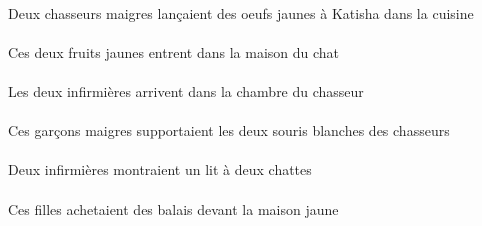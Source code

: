 \begin{exe}
\DEFSgOblP{}   \cuisineCSgOblP{}   \DANSP{}   \INDDuErgP{}   \maigreCDuP{}   \chasseurCDuErgP{}    \INDSgDatP{}   \KatishaASgDatP{}   \INDPlAbsP{}   \jauneDPlP{}   \oeufDPlAbsP{}  \lancerVdPstDPlP{}\\
Deux chasseurs maigres lançaient des oeufs jaunes à Katisha dans la cuisine
\ex\gll
\DEMDuAbs{}   \jauneBDu{}   \fruitBDuAbs{}    \DEFSgObl{}    \DEFSgObl{}   \chatDSgObl{}   \DE{}   \maisonDSgObl{}   \DANS{}  \entrerViPrsBDu{}\\
\DEMDuAbsP{}   \jauneBDuP{}   \fruitBDuAbsP{}    \DEFSgOblP{}    \DEFSgOblP{}   \chatDSgOblP{}   \DEP{}   \maisonDSgOblP{}   \DANSP{}  \entrerViPrsBDuP{}\\
Ces deux fruits jaunes entrent dans la maison du chat
\ex\gll
\DEFDuAbs{}   \infirmiereBDuAbs{}    \DEFSgObl{}    \DEFSgObl{}   \chasseurCSgObl{}   \DE{}   \chambreBSgObl{}   \DANS{}  \arriverViPrsBDu{}\\
\DEFDuAbsP{}   \infirmiereBDuAbsP{}    \DEFSgOblP{}    \DEFSgOblP{}   \chasseurCSgOblP{}   \DEP{}   \chambreBSgOblP{}   \DANSP{}  \arriverViPrsBDuP{}\\
Les deux infirmières arrivent dans la chambre du chasseur
\ex\gll
\DEMPlErg{}   \maigreBPl{}   \garconBPlErg{}   \DEFDuAbs{}    \DEFPlObl{}   \chasseurCPlObl{}   \DE{}   \blancADu{}   \sourisADuAbs{}  \supporterVtPstADu{}\\
\DEMPlErgP{}   \maigreBPlP{}   \garconBPlErgP{}   \DEFDuAbsP{}    \DEFPlOblP{}   \chasseurCPlOblP{}   \DEP{}   \blancADuP{}   \sourisADuAbsP{}  \supporterVtPstADuP{}\\
Ces garçons maigres supportaient les deux souris blanches des chasseurs
\ex\gll
\INDDuErg{}   \infirmiereBDuErg{}    \INDDuDat{}   \chatDDuDat{}   \INDSgAbs{}   \litDSgAbs{}  \montrerVdPstDSg{}\\
\INDDuErgP{}   \infirmiereBDuErgP{}    \INDDuDatP{}   \chatDDuDatP{}   \INDSgAbsP{}   \litDSgAbsP{}  \montrerVdPstDSgP{}\\
Deux infirmières montraient un lit à deux chattes
\ex\gll
\DEFSgObl{}   \jauneDSg{}   \maisonDSgObl{}   \DEVANT{}   \DEMPlErg{}   \filleCPlErg{}   \INDPlAbs{}   \balaiCPlAbs{}  \acheterVtPstCPl{}\\
\DEFSgOblP{}   \jauneDSgP{}   \maisonDSgOblP{}   \DEVANTP{}   \DEMPlErgP{}   \filleCPlErgP{}   \INDPlAbsP{}   \balaiCPlAbsP{}  \acheterVtPstCPlP{}\\
Ces filles achetaient des balais devant la maison jaune
\ex\gll
\INDSgErg{}   \NicoleDSgErg{}    \DEFPlDat{}    \DEFPlObl{}   \infirmiereBPlObl{}   \DE{}   \filleCPlDat{}   \DEFSgAbs{}    \DEFSgObl{}   \maisonDSgObl{}   \DE{}   \cuisineCSgAbs{}  \montrerVdPrsCSg{}\\

\end{exe}
